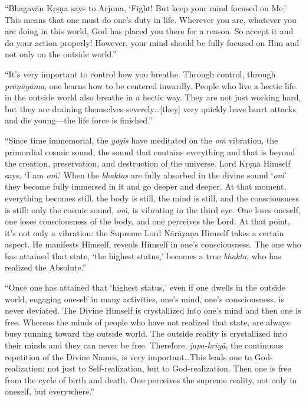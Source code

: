 \enquote{Bhagavān Kṛṣṇa says to Arjuna, \enquote{Fight! But keep your mind focused on Me.} This means that one must do one’s duty in life. Wherever you are, whatever you are doing in this world, God has placed you there for a reason. So accept it and do your action properly! However, your mind should be fully focused on Him and not only on the outside world.}

\enquote{It’s very important to control how you breathe. Through control, through \textit{prāṇāyāma}, one learns how to be centered inwardly. People who live a hectic life in the outside world also breathe in a hectic way. They are not just working hard, but they are draining themselves severely\ldots [they] very quickly have heart attacks and die young---the life force is finished.}

\enquote{Since time immemorial, the \textit{yogīs} have meditated on the \textit{oṁ} vibration, the primordial cosmic sound, the sound that contains everything and that is beyond the creation, preservation, and destruction of the universe. Lord Kṛṣṇa Himself says, \enquote{I am \textit{oṁ}.} When the \textit{bhaktas} are fully absorbed in the divine sound \enquote{\textit{oṁ}} they become fully immersed in it and go deeper and deeper. At that moment, everything becomes still, the body is still, the mind is still, and the consciousness is still: only the cosmic sound, \textit{oṁ}, is vibrating in the third eye. One loses oneself, one loses consciousness of the body, and one perceives the Lord. At that point, it’s not only a vibration: the Supreme Lord Nārāyaṇa Himself takes a certain aspect. He manifests Himself, reveals Himself in one’s consciousness. The one who has attained that state, \enquote{the highest status,} becomes a true \textit{bhakta}, who has realized the Absolute.}

\enquote{Once one has attained that \enquote{highest status,} even if one dwells in the outside world, engaging oneself in many activities, one’s mind, one’s consciousness, is never deviated. The Divine Himself is crystallized into one’s mind and then one is free. Whereas the minds of people who have not realized that state, are always busy running toward the outside world. The outside reality is crystallized into their minds and they can never be free. Therefore, \textit{japa-kriyā}, the continuous repetition of the Divine Names, is very important\ldots This leads one to God-realization; not just to Self-realization, but to God-realization. Then one is free from the cycle of birth and death. One perceives the supreme reality, not only in oneself, but everywhere.}

